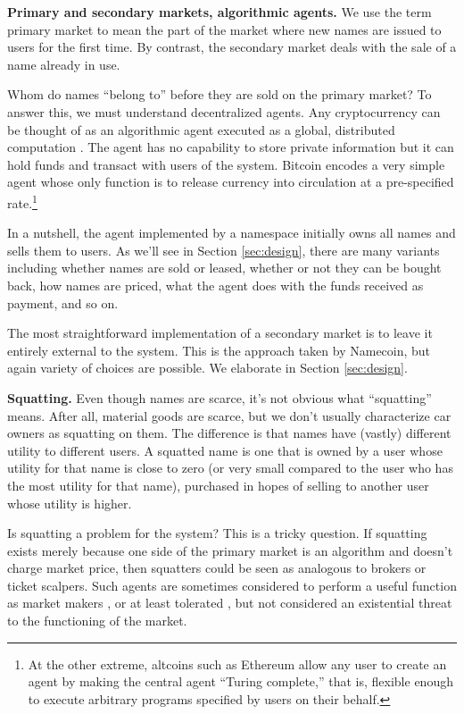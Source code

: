 {\bf Primary and secondary markets, algorithmic agents.} We use the term primary market to mean the part of the market where new names are issued to users for the first time. By contrast, the secondary market deals with the sale of a name already in use. 

Whom do names ``belong to'' before they are sold on the primary market? To answer this, we must understand decentralized agents. Any cryptocurrency can be thought of as an algorithmic agent executed as a global, distributed computation \cite{}. The agent has no capability to store private information but it can hold funds and transact with users of the system. Bitcoin encodes a very simple agent whose only function is to release currency into circulation at a pre-specified rate.\footnote{At the other extreme, altcoins such as Ethereum allow any user to create an agent by making the central agent ``Turing complete,'' that is, flexible enough to execute arbitrary programs specified by users on their behalf.} 

In a nutshell, the agent implemented by a namespace initially owns all names and sells them to users. As we'll see in Section \ref{sec:design}, there are many variants including whether names are sold or leased, whether or not they can be bought back, how names are priced, what the agent does with the funds received as payment, and so on.

The most straightforward implementation of a secondary market is to leave it entirely external to the system. This is the approach taken by Namecoin, but again variety of choices are possible. We elaborate in Section \ref{sec:design}.

{\bf Squatting.} Even though names are scarce, it's not obvious what ``squatting'' means. After all, material goods are scarce, but we don't usually characterize car owners as squatting on them. The difference is that names have (vastly) different utility to different users. A squatted name is one that is owned by a user whose utility for that name is close to zero (or very small compared to the user who has the most utility for that name), purchased in hopes of selling to another user whose utility is higher.

Is squatting a problem for the system? This is a tricky question. If squatting exists merely because one side of the primary market is an algorithm and doesn't charge market price, then squatters could be seen as analogous to brokers or ticket scalpers. Such agents are sometimes considered to perform a useful function as market makers \cite{}, or at least tolerated \cite{}, but not considered an existential threat to the functioning of the market.

